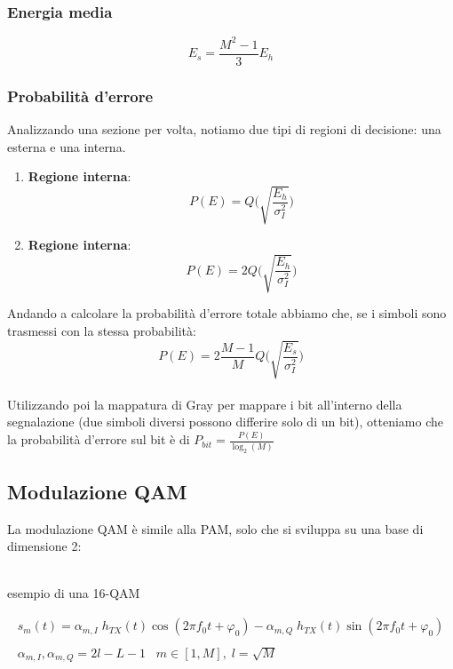 \documentclass{article}
\begin{document}
\subsubsection{Energia media}
$$E_s=\frac{M^2-1}{3}E_h$$

\subsubsection{Probabilità d'errore}
Analizzando una sezione per volta, notiamo due tipi di regioni di decisione: una esterna e una interna.
\begin{enumerate}
	\item \textbf{Regione interna}:$$P(E)=Q\biggl(\sqrt{\frac{E_h}{\sigma_I^2}}\biggl)$$
	\item \textbf{Regione interna}:$$P(E)=2Q\biggl(\sqrt{\frac{E_h}{\sigma_I^2}}\biggl)$$
\end{enumerate}
Andando a calcolare la probabilità d'errore totale abbiamo che, se i simboli sono trasmessi con la stessa probabilità:$$P(E)=2\frac{M-1}{M}Q\biggl(\sqrt{\frac{E_s}{\sigma_I^2}}\biggl)$$\\
Utilizzando poi la mappatura di Gray per mappare i bit all'interno della segnalazione (due simboli diversi possono differire solo di un bit), otteniamo che la probabilità d'errore sul bit è di $P_{bit}=\frac{P(E)}{\log_2(M)}$

\subsection{Modulazione QAM}
La modulazione QAM è simile alla PAM, solo che si sviluppa su una base di dimensione 2:
\begin{center}
	\\
	esempio di una 16-QAM
\end{center}
$$\begin{array}{c}
	s_m(t)=\alpha_{m,I}\;h_{TX}(t)\cos(2\pi f_0t+\varphi_0)-\alpha_{m,Q}\;h_{TX}(t)\sin(2\pi f_0t+\varphi_0)\\\\
	\alpha_{m,I},\alpha_{m,Q}=2l-L-1\;\;\;m\in[1,M],\;l=\sqrt{M}
\end{array}$$
\end{document}
